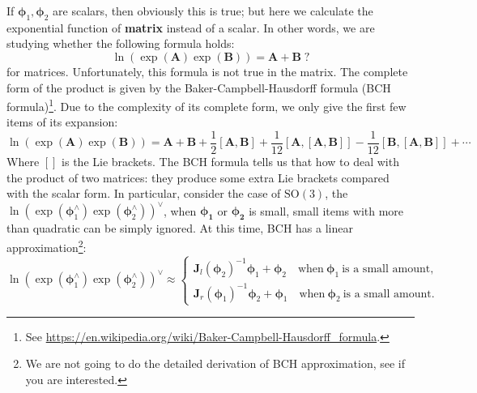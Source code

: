 If $\boldsymbol{\phi}_1, \boldsymbol{\phi}_2$ are scalars, then obviously this is true; but here we calculate the exponential function of \textbf{matrix} instead of a scalar. In other words, we are studying whether the following formula holds:
\[
\ln \left( \exp \left( \mathbf{A} \right) \exp \left( \mathbf{B} \right) \right) = \mathbf{A} + \mathbf{B} \; ?
\]
for matrices. Unfortunately, this formula is not true in the matrix. The complete form of the product is given by the Baker-Campbell-Hausdorff formula (BCH formula)\footnote{ See \url{https://en.wikipedia.org/wiki/Baker-Campbell-Hausdorff\_formula}. }. Due to the complexity of its complete form, we only give the first few items of its expansion:
\begin{equation}
\ln \left( {\exp \left( \mathbf{A} \right)\exp \left( \mathbf{B} \right)} \right) = \mathbf{A} + \mathbf{B} + \frac{1}{2}\left[ {\mathbf{A}, \mathbf{B}} \right] + \frac{1}{{12}}\left[ {\mathbf{A},\left[ {\mathbf{A}, \mathbf{B}} \right]} \right] - \frac{1}{{12}}\left[ {\mathbf{B},\left[ {\mathbf{A} ,\mathbf{B}} \right]} \right] + \cdots
\end{equation}
Where $[]$ is the Lie brackets. The BCH formula tells us that how to deal with the product of two matrices: they produce some extra Lie brackets compared with the scalar form. In particular, consider the case of $\mathrm{SO}(3)$, the $\ln { \left( {\exp \left( { \boldsymbol{\phi} _1^ \wedge } \right)\exp \left ( {\boldsymbol{\phi} _2^ \wedge } \right)} \right) ^ \vee }$, when $\boldsymbol{\phi_1}$ or $\boldsymbol{\phi_2}$ is small, small items with more than quadratic can be simply ignored. At this time, BCH has a linear approximation\footnote{We are not going to do the detailed derivation of BCH approximation, see \cite{Barfoot2016} if you are interested. }:
\begin{equation}
\ln { \left( {\exp \left( { \boldsymbol{\phi} _1^ \wedge } \right)\exp \left( {\boldsymbol{\phi} _2^ \wedge } \right)} \right ) ^ \vee } \approx \left\{
\begin{array}{l}
{\mathbf{J}_l}{\left( {{\boldsymbol{\phi} _2}} \right)^{ - 1}}{ \boldsymbol{\phi} _1} + {\boldsymbol{\phi} _2 } \quad \text{when} \ \boldsymbol{\phi}_1 \ \text{is a small amount},\\
{\mathbf{J}_r}{\left( {{\boldsymbol{\phi} _1}} \right)^{ - 1}}{\boldsymbol{\phi} _2} + {\boldsymbol{\phi} _1 } \quad \text{when} \  \boldsymbol{\phi}_2 \ \text{is a small amount}.
\end{array} \right.
\end{equation}

